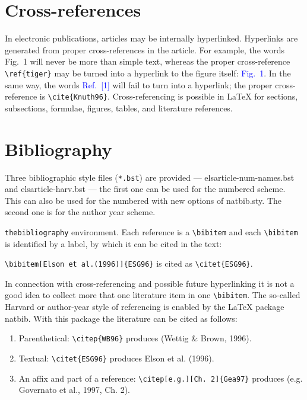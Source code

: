 \documentclass[a4paper,fleqn]{cas-sc}
\begin{document}
\section{Cross-references}
In electronic publications, articles may be internally
hyperlinked. Hyperlinks are generated from proper
cross-references in the article.  For example, the words
\textcolor{black!80}{Fig.~1} will never be more than simple text,
whereas the proper cross-reference \verb+\ref{tiger}+ may be
turned into a hyperlink to the figure itself:
\textcolor{blue}{Fig.~1}.  In the same way,
the words \textcolor{blue}{Ref.~[1]} will fail to turn into a
hyperlink; the proper cross-reference is \verb+\cite{Knuth96}+.
Cross-referencing is possible in \LaTeX{} for sections,
subsections, formulae, figures, tables, and literature
references.

\section{Bibliography}

Three bibliographic style files (\verb+*.bst+) are provided ---
{elsarticle-num-names.bst} and
{elsarticle-harv.bst} --- the first one can be used for the
numbered scheme. This can also be used for the numbered with new
options of {natbib.sty}. The second one is for the author year
scheme.

\verb+thebibliography+ environment.  Each reference is a
\verb+\bibitem+ and each \verb+\bibitem+ is identified by a label,
by which it can be cited in the text:

\verb+\bibitem[Elson et al.(1996)]{ESG96}+ is cited as
\verb+\citet{ESG96}+. 

\noindent In connection with cross-referencing and
possible future hyperlinking it is not a good idea to collect
more that one literature item in one \verb+\bibitem+.  The
so-called Harvard or author-year style of referencing is enabled
by the \LaTeX{} package {natbib}. With this package the
literature can be cited as follows:


\begin{enumerate}[\textbullet]
\item Parenthetical: \verb+\citep{WB96}+ produces (Wettig \& Brown, 1996).
\item Textual: \verb+\citet{ESG96}+ produces Elson et al. (1996).
\item An affix and part of a reference:
\verb+\citep[e.g.][Ch. 2]{Gea97}+ produces (e.g. Governato et
al., 1997, Ch. 2).
\end{enumerate}
\end{document}
